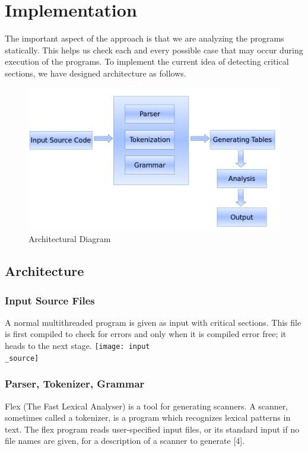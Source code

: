 \chapter{Implementation}

The important aspect of the approach is that we are analyzing the programs statically. This helps us check each and every possible case that may occur during execution of the programs. To implement the current idea of detecting critical sections, we have designed architecture as follows.


\begin{figure}[H]
\centering
\includegraphics[scale=0.4]{architecture.png}
\caption{Architectural Diagram}
\label{<<Label>>}
\end{figure}

\section{Architecture}

\subsection{Input Source Files}
A normal multithreaded program is given as input with critical sections. This file is first compiled to check for errors and only when it is compiled error free; it heads to the next stage.
\texttt{[image: input\\\_source]}\\[0.5c]

\subsection{Parser, Tokenizer, Grammar}
Flex (The Fast Lexical Analyser) is a tool for generating scanners. A scanner, sometimes called a tokenizer, is a program which recognizes lexical patterns in text. The flex program reads user-specified input files, or its standard input if no file names are given, for a description of a scanner to generate [4].

